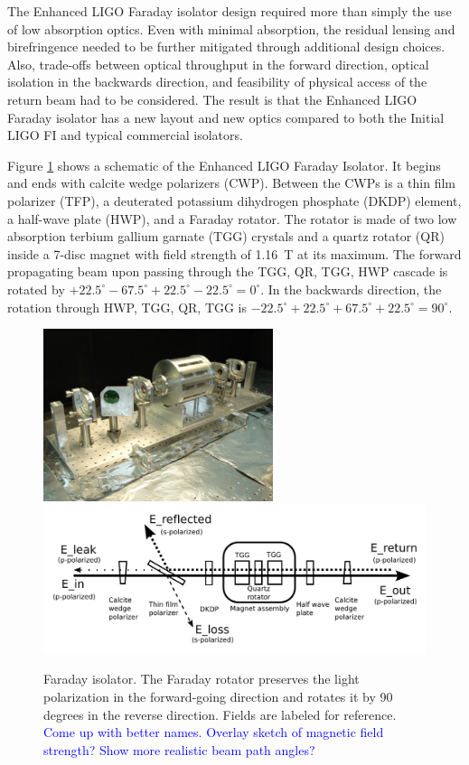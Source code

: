 The Enhanced LIGO Faraday isolator design required more than simply
the use of low absorption optics. Even with minimal absorption, the
residual lensing and birefringence needed to be further mitigated
through additional design choices. Also, trade-offs between optical
throughput in the forward direction, optical isolation in the
backwards direction, and feasibility of physical access of the return
beam had to be considered. The result is that the Enhanced LIGO
Faraday isolator has a new layout and new optics compared to both the
Initial LIGO FI and typical commercial isolators.

Figure \ref{fig:FI} shows a schematic of the Enhanced LIGO Faraday
Isolator. It begins and ends with calcite wedge polarizers
(CWP). Between the CWPs is a thin film polarizer (TFP), a deuterated
potassium dihydrogen phosphate (DKDP) element, a half-wave plate
(HWP), and a Faraday rotator. The rotator is made of two low
absorption terbium gallium garnate (TGG) crystals and a quartz rotator (QR)
inside a 7-disc magnet with field strength of 1.16~T at its
maximum. The forward propagating beam upon passing through the
TGG, QR, TGG, HWP cascade is rotated by $+22.5^\circ -
67.5^\circ + 22.5^\circ - 22.5^\circ = 0^\circ$. In the backwards
direction, the rotation through HWP, TGG, QR, TGG is $-22.5^\circ +
22.5^\circ + 67.5^\circ + 22.5^\circ = 90^\circ$.

\begin{figure}
\begin{centering}
\includegraphics[width=0.6\textwidth]{figures/FI.jpg}
\includegraphics[width=1.0\textwidth]{figures/FaradayIsolator_nocolor.pdf}
\caption{Faraday isolator. The Faraday rotator preserves the light
  polarization in the forward-going direction and rotates it by 90
  degrees in the reverse direction. Fields are labeled for
  reference. \textcolor{blue}{Come up with better names. Overlay sketch of magnetic field
    strength? Show more realistic beam path angles?}}
\label{fig:FI}
\end{centering}
\end{figure}

